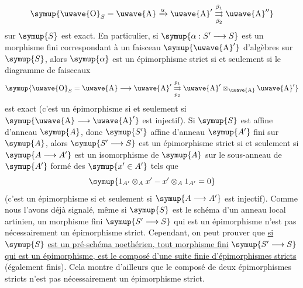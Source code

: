 \[
  \symup{\text{\uwave{O}}_S=\text{\uwave{A}}\xrightarrow{\alpha}\text{\uwave{A}}'
  \overset{\beta_1}{\underset{\beta_2}{\rightrightarrows}}\text{\uwave{A}}''}
\]
sur $\symup{S}$ est exact. En particulier, si $\symup{\alpha:S'\longrightarrow S}$ est un
morphisme fini correspondant à un faisceau $\symup{\text{\uwave{A}}'}$ d'algèbres sur $\symup{S}$,
alors $\symup{\alpha}$ est un épimorphisme strict si et seulement si le diagramme de
faisceaux
\[
  \symup{\text{\uwave{O}}_S=\text{\uwave{A}}\longrightarrow\text{\uwave{A}}'
  \overset{p_1}{\underset{p_2}{\rightrightarrows}}
  \text{\uwave{A}}'\otimes_{\text{\uwave{A}}}\text{\uwave{A}}'}
\]
est exact (c'est un épimorphisme si et seulement si
$\symup{\text{\uwave{A}}\longrightarrow\text{\uwave{A}}'}$ est injectif). Si $\symup{S}$ est affine
d'anneau $\symup{A}$, donc $\symup{S'}$ affine d'anneau $\symup{A'}$ fini sur $\symup{A}$, alors
$\symup{S'\longrightarrow S}$ est un épimorphisme strict si et seulement si
$\symup{A\longrightarrow A'}$ est un isomorphisme de $\symup{A}$ sur le sous-anneau de $\symup{A'}$
formé des $\symup{x'\in A'}$ tels que
\[
  \symup{1_{A'}\otimes_Ax'-x'\otimes_A1_{A'}=0}
\]
(c'est un épimorphisme si et seulement si $\symup{A\longrightarrow A'}$ est injectif).
Comme nous l'avons déjà signalé, même si $\symup{S}$ est le schéma d'un anneau local
artinien, un morphisme fini $\symup{S'\longrightarrow S}$ qui est un épimorphisme n'est
pas nécessairement un épimorphisme strict. Cependant, on peut prouver que \uline{si}
$\symup{S}$ \uline{est un pré-schéma noethérien, tout morphisme fini} $\symup{S'\longrightarrow S}$ \uline{qui
est un épimorphisme, est le composé d'une suite finie d'épimorphismes stricts}
(également finis). Cela montre d'ailleurs que le composé de deux épimorphismes
stricts n'est pas nécessairement un épimorphisme strict.

